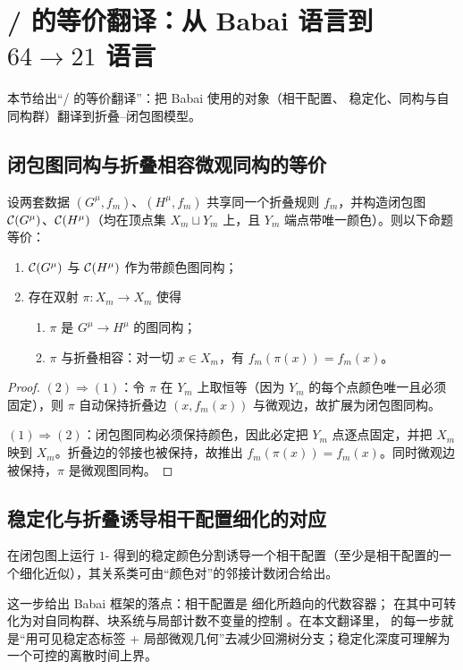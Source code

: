 
\section{\GI{}/\WL{} 的等价翻译：从 Babai 语言到 \texorpdfstring{$64\to 21$}{64->21} 语言}

本节给出“\GI{}/\WL{} 的等价翻译”：把 Babai 使用的对象（相干配置、\WL{} 稳定化、同构与自同构群）翻译到折叠--闭包图模型。

\subsection{闭包图同构与折叠相容微观同构的等价}

\begin{theorem}[闭包 \GI{} 的等价翻译]\label{thm:gi-translation}
设两套数据 $(G^{\mu},f_m)$、$(H^{\mu},f_m)$ 共享同一个折叠规则 $f_m$，并构造闭包图 $\mathcal{C}(G^{\mu})$、$\mathcal{C}(H^{\mu})$（均在顶点集 $X_m\sqcup Y_m$ 上，且 $Y_m$ 端点带唯一颜色）。则以下命题等价：
\begin{enumerate}
  \item $\mathcal{C}(G^{\mu})$ 与 $\mathcal{C}(H^{\mu})$ 作为带颜色图同构；
  \item 存在双射 $\pi:X_m\to X_m$ 使得
  \begin{enumerate}
    \item $\pi$ 是 $G^{\mu}\to H^{\mu}$ 的图同构；
    \item $\pi$ 与折叠相容：对一切 $x\in X_m$，有 $f_m(\pi(x))=f_m(x)$。
  \end{enumerate}
\end{enumerate}
\end{theorem}

\begin{proof}
$(2)\Rightarrow(1)$：令 $\pi$ 在 $Y_m$ 上取恒等（因为 $Y_m$ 的每个点颜色唯一且必须固定），则 $\pi$ 自动保持折叠边 $(x,f_m(x))$ 与微观边，故扩展为闭包图同构。

$(1)\Rightarrow(2)$：闭包图同构必须保持颜色，因此必定把 $Y_m$ 点逐点固定，并把 $X_m$ 映到 $X_m$。折叠边的邻接也被保持，故推出 $f_m(\pi(x))=f_m(x)$。同时微观边被保持，$\pi$ 是微观图同构。
\end{proof}

\subsection{\WL{} 稳定化与折叠诱导相干配置细化的对应}

\begin{proposition}\label{prop:wl-cc}
在闭包图上运行 $1$-\WL{} 得到的稳定颜色分割诱导一个相干配置（至少是相干配置的一个细化近似），其关系类可由“颜色对”的邻接计数闭合给出。
\end{proposition}

\begin{remark}
这一步给出 Babai 框架的落点：相干配置是 \WL{} 细化所趋向的代数容器；\GI{} 在其中可转化为对自同构群、块系统与局部计数不变量的控制 \cite{babai2016gi,wl2018symmetryvsregularity}。在本文翻译里，\WL{} 的每一步就是“用可见稳定态标签 + 局部微观几何”去减少回溯树分支；稳定化深度可理解为一个可控的离散时间上界。
\end{remark}

